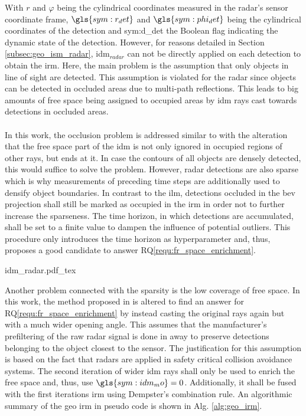 With $r$ and $\varphi$ being the cylindrical coordinates measured in the radar's sensor coordinate frame, $\gls{sym:r_det}$ and $\gls{sym:phi_det}$ being the cylindrical  coordinates of the detection and \gls{sym:d_det} the Boolean flag indicating the dynamic state of the detection. However, for reasons detailed in Section \ref{subsec:geo_ism_radar}, \gls{idm}$_{radar}$ can not be directly applied on each detection to obtain the \gls{irm}. Here, the main problem is the assumption that only objects in line of sight are detected. This assumption is violated for the radar since objects can be detected in occluded areas due to multi-path reflections. This leads to big amounts of free space being assigned to occupied areas by \gls{idm} rays cast towards detections in occluded areas. 
\\\\
In this work, the occlusion problem is addressed similar to \cite{werber2015automotive} with the alteration that the free space part of the \gls{idm} is not only ignored in occupied regions of other rays, but ends at it. In case the contours of all objects are densely detected, this would suffice to solve the problem. However, radar detections are also sparse which is why measurements of preceding time steps are additionally used to densify object boundaries. In contrast to the \gls{ilm}, detections occluded in the \gls{bev} projection shall still be marked as occupied in the \gls{irm} in order not to further increase the sparseness. The time horizon, in which detections are accumulated, shall be set to a finite value to dampen the influence of potential outliers. This procedure only introduces the time horizon as hyperparameter and, thus, proposes a good candidate to answer RQ\ref{requ:fr_space_enrichment}.
\begin{center}
	{idm_radar.pdf_tex}
\end{center}
Another problem connected with the sparsity is the low coverage of free space. In this work, the method proposed in \cite{prophet2018adaptions} is altered to find an answer for RQ\ref{requ:fr_space_enrichment} by instead casting the original rays again but with a much wider opening angle. This assumes that the manufacturer's prefiltering of the raw radar signal is done in away to preserve detections belonging to the object closest to the sensor. The justification for this assumption is based on the fact that radars are applied in safety critical collision avoidance systems. The second iteration of wider \gls{idm} rays shall only be used to enrich the free space and, thus, use $\gls{sym:idm_mo} = 0$. Additionally, it shall be fused with the first iterations \gls{irm} using Dempster's combination rule. An algorithmic summary of the geo \gls{irm} in pseudo code is shown in Alg. \ref{alg:geo_irm}.
